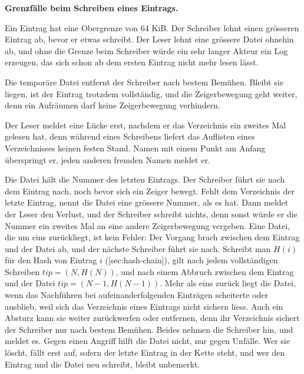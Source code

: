 {\startinfobox
{\bf Grenzfälle beim Schreiben eines Eintrags.}
\startitemize
\item Ein Eintrag hat eine Obergrenze von 64 KiB.
Der Schreiber lehnt einen grösseren Eintrag ab, bevor er etwas schreibt.
Der Leser lehnt eine grössere Datei ohnehin ab,
und ohne die Grenze beim Schreiber würde ein sehr langer Akteur ein Log erzeugen,
das sich schon ab dem ersten Eintrag nicht mehr lesen lässt.
\item Die temporäre Datei entfernt der Schreiber nach bestem Bemühen.
Bleibt sie liegen, ist der Eintrag trotzdem vollständig, und die Zeigerbewegung geht weiter,
denn ein Aufräumen darf keine Zeigerbewegung verhindern.
\item Der Leser meldet eine Lücke erst, nachdem er das Verzeichnis ein zweites Mal gelesen hat,
denn während eines Schreibens liefert das Auflisten eines Verzeichnisses keinen festen Stand.
Namen mit einem Punkt am Anfang überspringt er, jeden anderen fremden Namen meldet er.
\stopitemize
\stopinfobox

Die Datei  hält die Nummer des letzten Eintrags.
Der Schreiber führt sie nach dem Eintrag nach, noch bevor sich ein Zeiger bewegt.
Fehlt dem Verzeichnis der letzte Eintrag, nennt die Datei eine grössere Nummer, als es hat.
Dann meldet der Leser den Verlust, und der Schreiber schreibt nichts,
denn sonst würde er die Nummer ein zweites Mal an eine andere Zeigerbewegung vergeben.
Eine Datei, die um eins zurückliegt, ist kein Fehler:
Der Vorgang brach zwischen dem Eintrag und der Datei ab,
und der nächste Schreiber führt sie nach.
Schreibt man $H(i)$ für den Hash von Eintrag $i$ ([sec:hash-chain]),
gilt nach jedem vollständigen Schreiben $\mathit{tip} = (N, H(N))$,
und nach einem Abbruch zwischen dem Eintrag und der Datei $\mathit{tip} = (N-1, H(N-1))$.
Mehr als eins zurück liegt die Datei, wenn das Nachführen bei aufeinanderfolgenden Einträgen
scheiterte oder ausblieb, weil sich das Verzeichnis eines Eintrags nicht sichern liess.
Auch ein Absturz kann sie weiter zurückwerfen oder entfernen,
denn ihr Verzeichnis sichert der Schreiber nur nach bestem Bemühen.
Beides nehmen die Schreiber hin, und  meldet es.
Gegen einen Angriff hilft die Datei nicht, nur gegen Unfälle.
Wer sie löscht, fällt erst  auf,
sofern der letzte Eintrag in der Kette steht,
und wer den Eintrag und die Datei neu schreibt, bleibt unbemerkt.

}
